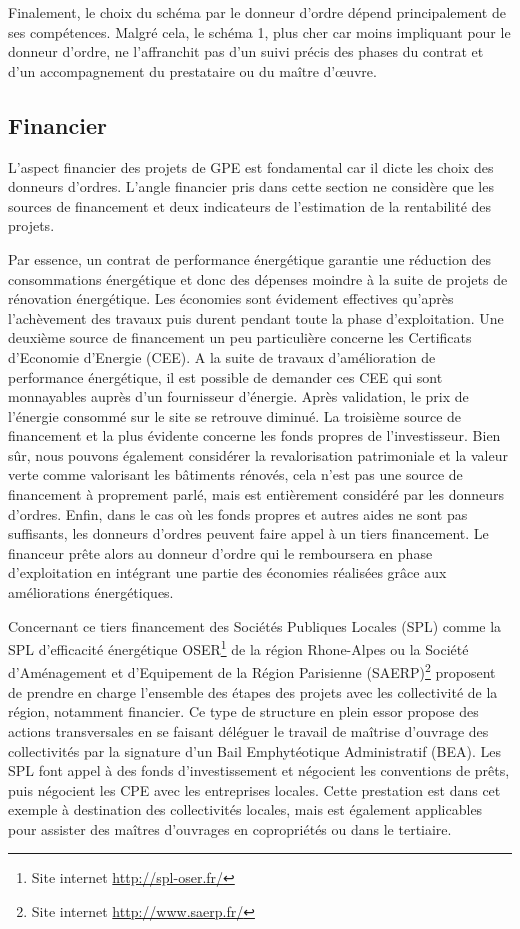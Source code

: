 Finalement, le choix du schéma par le donneur d'ordre dépend principalement de ses compétences. Malgré cela, le schéma 1, plus cher car moins impliquant pour le donneur d'ordre, ne l'affranchit pas d'un suivi précis des phases du contrat et d'un accompagnement du prestataire ou du maître d'œuvre.

\subsection{Financier}

L'aspect financier des projets de GPE est fondamental car il dicte les choix des donneurs d'ordres. L'angle financier pris dans cette section ne considère que les sources de financement et deux indicateurs de l'estimation de la rentabilité des projets.

Par essence, un contrat de performance énergétique garantie une réduction des consommations énergétique et donc des dépenses moindre à la suite de projets de rénovation énergétique. Les économies sont évidement effectives qu'après l'achèvement des travaux puis durent pendant toute la phase d'exploitation. Une deuxième source de financement un peu particulière concerne les Certificats d'Economie d'Energie (CEE). A la suite de travaux d'amélioration de performance énergétique, il est possible de demander ces CEE qui sont monnayables auprès d'un fournisseur d'énergie. Après validation, le prix de l'énergie consommé sur le site se retrouve diminué. La troisième source de financement et la plus évidente concerne les fonds propres de l'investisseur. Bien sûr, nous pouvons également considérer la revalorisation patrimoniale et la valeur verte comme valorisant les bâtiments rénovés, cela n'est pas une source de financement à proprement parlé, mais est entièrement considéré par les donneurs d'ordres. Enfin, dans le cas où les fonds propres et autres aides ne sont pas suffisants, les donneurs d'ordres peuvent faire appel à un tiers financement. Le financeur prête alors au donneur d'ordre qui le remboursera en phase d'exploitation en intégrant une partie des économies réalisées grâce aux améliorations énergétiques.

Concernant ce tiers financement des Sociétés Publiques Locales (SPL) comme la SPL d'efficacité énergétique OSER\footnote{Site internet \url{http://spl-oser.fr/}} de la région Rhone-Alpes ou la Société d'Aménagement et d'Equipement de la Région Parisienne (SAERP)\footnote{Site internet \url{http://www.saerp.fr/}} proposent de prendre en charge l'ensemble des étapes des projets avec les collectivité de la région, notamment financier. Ce type de structure en plein essor propose des actions transversales en se faisant déléguer le travail de maîtrise d'ouvrage des collectivités par la signature d'un Bail Emphytéotique Administratif (BEA). Les SPL font appel à des fonds d'investissement et négocient les conventions de prêts, puis négocient les CPE avec les entreprises locales. Cette prestation est dans cet exemple à destination des collectivités locales, mais est également applicables pour assister des maîtres d'ouvrages en copropriétés ou dans le tertiaire.

